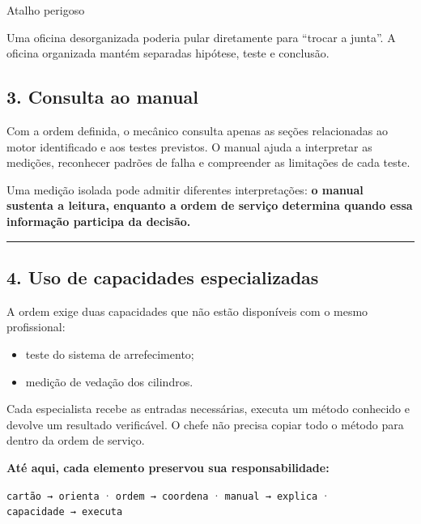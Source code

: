 \documentclass[
  10pt,
  a4paper,
  oneside]{book}
\providecommand{\tightlist}{%
  \setlength{\itemsep}{0pt}\setlength{\parskip}{0pt}}
\begin{document}
\begin{warningbox}{Atalho perigoso}

Uma oficina desorganizada poderia pular diretamente para ``trocar a
junta''. A oficina organizada mantém separadas hipótese, teste e
conclusão.

\end{warningbox}

\hypertarget{consulta-ao-manual}{%
\subsection{3. Consulta ao manual}\label{consulta-ao-manual}}

Com a ordem definida, o mecânico consulta apenas as seções relacionadas
ao motor identificado e aos testes previstos. O manual ajuda a
interpretar as medições, reconhecer padrões de falha e compreender as
limitações de cada teste.

Uma medição isolada pode admitir diferentes interpretações: \textbf{o
manual sustenta a leitura, enquanto a ordem de serviço determina quando
essa informação participa da decisão.}

\begin{center}\rule{0.5\linewidth}{0.5pt}\end{center}

\hypertarget{uso-de-capacidades-especializadas}{%
\subsection{4. Uso de capacidades
especializadas}\label{uso-de-capacidades-especializadas}}

A ordem exige duas capacidades que não estão disponíveis com o mesmo
profissional:

\begin{itemize}
\tightlist
\item
  teste do sistema de arrefecimento;
\item
  medição de vedação dos cilindros.
\end{itemize}

Cada especialista recebe as entradas necessárias, executa um método
conhecido e devolve um resultado verificável. O chefe não precisa copiar
todo o método para dentro da ordem de serviço.

\textbf{Até aqui, cada elemento preservou sua responsabilidade:}

\texttt{cartão\ →\ orienta} · \texttt{ordem\ →\ coordena} ·
\texttt{manual\ →\ explica} · \texttt{capacidade\ →\ executa}
\end{document}
